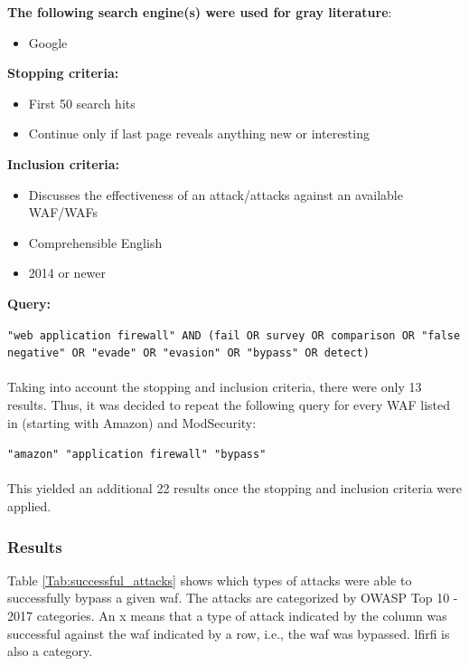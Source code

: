 \textbf{The following search engine(s) were used for gray literature}:
\begin{itemize}
    \item Google
\end{itemize} 

\textbf{Stopping criteria:}
\begin{itemize}
    \item First 50 search hits
    \item Continue only if last page reveals anything new or interesting
\end{itemize}

\textbf{Inclusion criteria:}
\begin{itemize}
    \item Discusses the effectiveness of an attack/attacks against an available WAF/WAFs 
    \item Comprehensible English
    \item 2014 or newer
\end{itemize}

\textbf{Query:}

\texttt{"web application firewall" AND  (fail  OR  survey  OR  comparison  OR  "false negative" OR  "evade"  OR  "evasion"  OR  "bypass" OR detect)}
\\\\
Taking into account the stopping and inclusion criteria, there were only 13 results. Thus, it was decided to repeat the following query for every WAF listed in \cite{gartner2020} (starting with Amazon) and ModSecurity:

\texttt{"amazon" "application firewall" "bypass"}
\\\\
This yielded an additional 22 results once the stopping and inclusion criteria were applied.

\subsubsection{Results}
Table \ref{Tab:successful_attacks} shows which types of attacks were able to successfully bypass a given \acrshort{waf}. The attacks are categorized by OWASP Top 10 - 2017 categories. An x means that a type of attack indicated by the column was successful against the \acrshort{waf} indicated by a row, i.e., the \acrshort{waf} was bypassed. \acrfull{lfirfi} is also a category.

